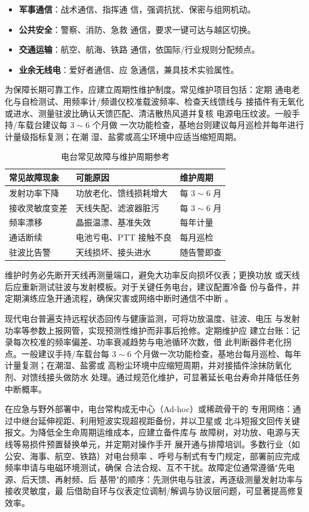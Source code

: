 \begin{itemize}
    \item \textbf{军事通信}：战术通信、指挥通
信，强调抗扰、保密与组网机动。
    \item \textbf{公共安全}：警察、消防、急救
通信，要求一键可达与越区切换。
    \item \textbf{交通运输}：航空、航海、铁路
通信，依国际/行业规则分配频点。
    \item \textbf{业余无线电}：爱好者通信、应
急通信，兼具技术实验属性。
\end{itemize}

为保障长期可靠工作，应建立周期性维护制度。常见维护项目包括：定期
通电老化与自检测试、用频率计/频谱仪校准载波频率、检查天线馈线与
接插件有无氧化或进水、测量驻波比确认天馈匹配、清洁散热风道并复核
电源电压纹波。一般手持/车载台建议每 $3\sim 6$ 个月做
一次功能检查，基地台则建议每月巡检并每年进行计量级指标复测；在潮
湿、盐雾或高尘环境中应适当缩短周期。

\begin{table}[htbp]
\centering
\caption{电台常见故障与维护周期参考}
\label{tab:station_maint}
\begin{tabular}{|p{3.4cm}|p{5.2cm}|p{3.0cm}|}
\hline
\textbf{常见故障现象} & \textbf{可能原因} & \textbf{维护周期} \\
\hline
发射功率下降 & 功放老化、馈线损耗增大 & 每 $3\sim 6$ 月 \\
\hline
接收灵敏度变差 & 天线失配、滤波器脏污 & 每 $3\sim 6$ 月 \\
\hline
频率漂移 & 晶振温漂、基准失效 & 每年计量 \\
\hline
通话断续 & 电池亏电、PTT 接触不良 & 每月巡检 \\
\hline
驻波比告警 & 天线损坏、接头进水 & 随告警即查 \\
\hline
\end{tabular}
\end{table}

维护时务必先断开天线再测量端口，避免大功率反向损坏仪表；更换功放
或天线后应重新测试驻波与发射模板。对于关键任务电台，建议配置冷备
份与备件，并定期演练应急开通流程，确保灾害或网络中断时通信不中断
。

现代电台普遍支持远程状态回传与健康监测，可将功放温度、驻波、电压
与发射功率等参数上报网管，实现预测性维护而非事后抢修。定期维护应
建立台账：记录每次校准的频率偏差、功率衰减趋势与电池循环次数，借
此判断器件老化拐点。一般建议手持/车载台每 $3\sim 6$ 
个月做一次功能检查，基地台每月巡检、每年计量复测；在潮湿、盐雾或
高粉尘环境中应缩短周期，并对接插件涂抹防氧化剂、对馈线接头做防水
处理。通过规范化维护，可显著延长电台寿命并降低任务中断概率。

在应急与野外部署中，电台常构成无中心（Ad-hoc）或稀疏骨干的
专用网络：通过中继台延伸视距、利用短波实现超视距备份，并以卫星或
北斗短报文回传关键报文。为降低全生命周期运维成本，应建立备件库与
故障树，对功放、电源与天线等易损件预置替换单元，并定期对操作手开
展开通与排障培训。多数行业（如公安、海事、航空、铁路）对电台频率
、呼号与制式有专门规定，部署前应完成频率申请与电磁环境测试，确保
合法合规、互不干扰。故障定位通常遵循"先电源、后天馈、再射频、后
基带"的顺序：先测供电与驻波，再逐级测量发射功率与接收灵敏度，最
后借助自环与仪表定位调制/解调与协议层问题，可显著提高修复效率。

